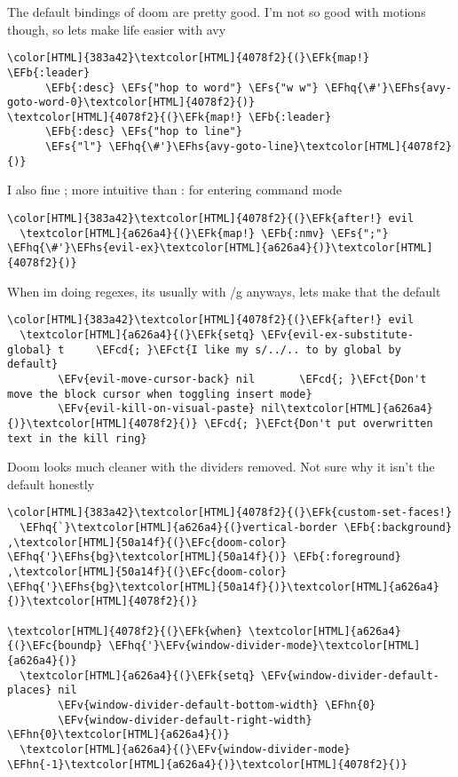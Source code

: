 \documentclass{scrartcl}
\newcommand{\EFk}[1]{\textcolor{EFk}{#1}} %
\newcommand{\EFs}[1]{\textcolor{EFs}{#1}} %
\newcommand{\EFb}[1]{\textcolor{EFb}{#1}} %
\newcommand{\EFct}[1]{\textcolor{EFct}{#1}} %
\newcommand{\EFc}[1]{\textcolor{EFc}{#1}} %
\newcommand{\EFv}[1]{\textcolor{EFv}{#1}} %
\newcommand{\EFcd}[1]{\textcolor{EFcd}{#1}} %
\newcommand{\EFhn}[1]{\textcolor{EFhn}{\textbf{#1}}} %
\newcommand{\EFhq}[1]{\textcolor{EFhq}{#1}} %
\newcommand{\EFhs}[1]{\textcolor{EFhs}{#1}} %
\begin{document}
The default bindings of doom are pretty good. I'm not so good with motions though, so lets make life easier with avy
\begin{Code}
\begin{Verbatim}[]
\color[HTML]{383a42}\textcolor[HTML]{4078f2}{(}\EFk{map!} \EFb{:leader}
      \EFb{:desc} \EFs{"hop to word"} \EFs{"w w"} \EFhq{\#'}\EFhs{avy-goto-word-0}\textcolor[HTML]{4078f2}{)}
\textcolor[HTML]{4078f2}{(}\EFk{map!} \EFb{:leader}
      \EFb{:desc} \EFs{"hop to line"}
      \EFs{"l"} \EFhq{\#'}\EFhs{avy-goto-line}\textcolor[HTML]{4078f2}{)}
\end{Verbatim}
\end{Code}

I also fine ; more intuitive than : for entering command mode
\begin{Code}
\begin{Verbatim}[]
\color[HTML]{383a42}\textcolor[HTML]{4078f2}{(}\EFk{after!} evil
  \textcolor[HTML]{a626a4}{(}\EFk{map!} \EFb{:nmv} \EFs{";"} \EFhq{\#'}\EFhs{evil-ex}\textcolor[HTML]{a626a4}{)}\textcolor[HTML]{4078f2}{)}
\end{Verbatim}
\end{Code}

When im doing regexes, its usually with /g anyways, lets make that the default
\begin{Code}
\begin{Verbatim}[]
\color[HTML]{383a42}\textcolor[HTML]{4078f2}{(}\EFk{after!} evil
  \textcolor[HTML]{a626a4}{(}\EFk{setq} \EFv{evil-ex-substitute-global} t     \EFcd{; }\EFct{I like my s/../.. to by global by default}
        \EFv{evil-move-cursor-back} nil       \EFcd{; }\EFct{Don't move the block cursor when toggling insert mode}
        \EFv{evil-kill-on-visual-paste} nil\textcolor[HTML]{a626a4}{)}\textcolor[HTML]{4078f2}{)} \EFcd{; }\EFct{Don't put overwritten text in the kill ring}
\end{Verbatim}
\end{Code}

Doom looks much cleaner with the dividers removed. Not sure why it isn't the default honestly
\begin{Code}
\begin{Verbatim}[]
\color[HTML]{383a42}\textcolor[HTML]{4078f2}{(}\EFk{custom-set-faces!}
  \EFhq{`}\textcolor[HTML]{a626a4}{(}vertical-border \EFb{:background} ,\textcolor[HTML]{50a14f}{(}\EFc{doom-color} \EFhq{'}\EFhs{bg}\textcolor[HTML]{50a14f}{)} \EFb{:foreground} ,\textcolor[HTML]{50a14f}{(}\EFc{doom-color} \EFhq{'}\EFhs{bg}\textcolor[HTML]{50a14f}{)}\textcolor[HTML]{a626a4}{)}\textcolor[HTML]{4078f2}{)}

\textcolor[HTML]{4078f2}{(}\EFk{when} \textcolor[HTML]{a626a4}{(}\EFc{boundp} \EFhq{'}\EFv{window-divider-mode}\textcolor[HTML]{a626a4}{)}
  \textcolor[HTML]{a626a4}{(}\EFk{setq} \EFv{window-divider-default-places} nil
        \EFv{window-divider-default-bottom-width} \EFhn{0}
        \EFv{window-divider-default-right-width} \EFhn{0}\textcolor[HTML]{a626a4}{)}
  \textcolor[HTML]{a626a4}{(}\EFv{window-divider-mode} \EFhn{-1}\textcolor[HTML]{a626a4}{)}\textcolor[HTML]{4078f2}{)}
\end{Verbatim}
\end{Code}
\end{document}
